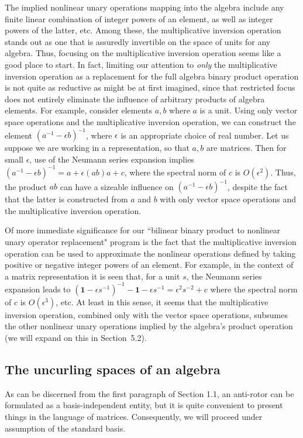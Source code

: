 \documentclass{amsart}
\numberwithin{equation}{section}
\theoremstyle{definition}
\numberwithin{theorem}{section}
\begin{document}
The implied nonlinear unary operations mapping into the algebra include any finite linear combination of integer powers of an element, as well as integer powers of the latter, etc.  Among these, the multiplicative inversion operation stands out as one that is assuredly invertible on the space of units for any algebra.   Thus, focusing on the multiplicative inversion operation seems like a good place to start.  In fact, limiting our attention to {\it only} the multiplicative inversion operation as a replacement for the full algebra binary product operation is not quite as reductive as might be at first imagined, since that restricted focus does not entirely eliminate the influence of arbitrary products of algebra elements.  For example, consider elements $a,b$ where $a$ is a unit.  Using only vector space operations and the multiplicative inversion operation, we can construct the element $(a^{-1}-\epsilon b)^{-1}$, where $\epsilon$ is an appropriate choice of real number.  Let us suppose we are working in a representation, so that $a,b$ are matrices.  Then for small $\epsilon$, use of the \mbox{Neumann} series expansion implies $(a^{-1}-\epsilon b)^{-1} = a+\epsilon(ab)a+c$, where the spectral norm of $c$ is $O(\epsilon^2)$.  Thus, the product $ab$ can have a sizeable influence on $(a^{-1}-\epsilon b)^{-1}$, despite the fact that the latter is constructed from $a$ and $b$ with only vector space operations and the multiplicative inversion operation.  

Of more immediate significance for our ``bilinear binary product to nonlinear unary operator replacement" program is the fact that the multiplicative inversion operation can be used to approximate the nonlinear operations defined by taking positive or negative integer powers of an element.  For example, in the context of a matrix representation it is seen that, for a unit $s$, the Neumann series expansion leads to \mbox{$(\mathbf{1}-\epsilon s^{- 1})^{-1} - \mathbf{1}- \epsilon s^{-1} = \epsilon^2 s^{-2} + c$} where the spectral norm of $c$ is $O(\epsilon^3)$, etc.  At least in this sense, it seems that the multiplicative inversion operation, combined only with the vector space operations, subsumes the other nonlinear unary operations implied by the algebra's product operation (we will expand on this in \mbox{Section 5.2}).  
 
      \subsection{The uncurling spaces of an algebra} As can be discerned from the first paragraph of Section 1.1, an anti-rotor can be formulated as a basis-independent entity, but it is quite convenient to present things in the language of matrices.  Consequently, we will proceed under assumption of the standard basis.     
       
\end{document}
